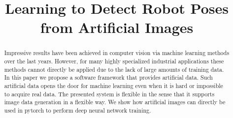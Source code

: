 \documentclass[conference]{IEEEtran}
\begin{document}
\title{Learning to Detect Robot Poses from Artificial Images\\
}

\author{
\and
{}
\and
{}
}

\maketitle

\begin{abstract}
Impressive results have been achieved in computer vision via machine learning methods over the last years. However, for many highly specialized industrial applications these methods cannot directly be applied due to the lack of large amounts of training data. In this paper we propose a software framework that provides artificial data. Such artificial data opens the door for machine learning even when it is hard or impossible to acquire real data. The presented system is flexible in the sense that it supports image data generation in a flexible way. We show how artificial images can directly be used in pytorch to perform deep neural network training. 
\end{abstract}
\end{document}
